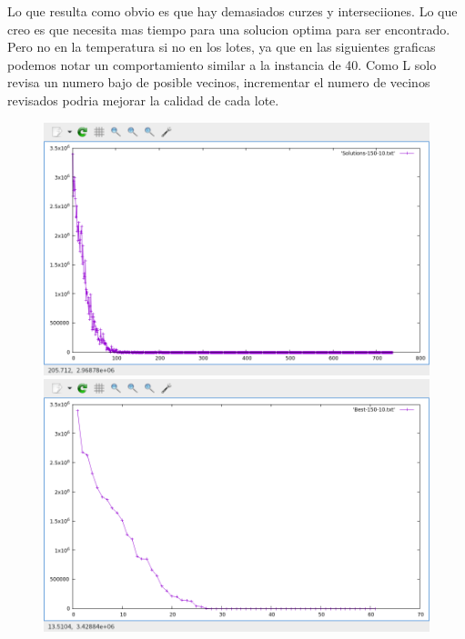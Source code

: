 \documentclass{article}
\begin{document}
    Lo que resulta como obvio es que hay demasiados curzes y interseciiones. Lo que creo es que necesita
    mas tiempo para una solucion optima para ser encontrado. Pero no en la temperatura si no en los lotes, ya
    que en las siguientes graficas podemos notar un comportamiento similar a la instancia de 40. Como
    L solo revisa un numero bajo de posible vecinos, incrementar el numero de vecinos revisados podria mejorar
    la calidad de cada lote.\\
    \begin{figure}[H]
        \centering
        \includegraphics[width=\textwidth,height=\textheight,keepaspectratio]{Solutions150.png}
        \includegraphics[width=\textwidth,height=\textheight,keepaspectratio]{Best150.png}
    \end{figure}\\
    
\end{document}
